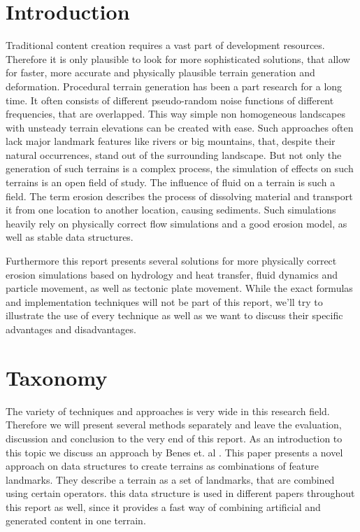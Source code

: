 \section{Introduction}
Traditional content creation requires a vast part of development resources. Therefore it is only plausible to look for more sophisticated solutions, that allow for faster, more accurate and physically plausible terrain generation and deformation. Procedural terrain generation has been a part research for a long time. It often consists of different pseudo-random noise functions of different frequencies, that are overlapped. This way simple non homogeneous landscapes with unsteady terrain elevations can be created with ease. Such approaches often lack major landmark features like rivers or big mountains, that, despite their natural occurrences, stand out of the surrounding landscape. But not only the generation of such terrains is a complex process, the simulation of effects on such terrains is an open field of study. The influence of fluid on a terrain is such a field. The term erosion describes the process of dissolving material and transport it from one location to another location, causing sediments. Such simulations heavily rely on physically correct flow simulations and a good erosion model, as well as stable data structures. 

Furthermore this report presents several solutions for more physically correct erosion simulations based on hydrology and heat transfer, fluid dynamics and particle movement, as well as tectonic plate movement. While the exact formulas  and implementation techniques will not be part of this report, we'll try to illustrate the use of every technique as well as we want to discuss their specific advantages and disadvantages.


\section{Taxonomy}

The variety of techniques and approaches is very wide in this research field. Therefore we will present several methods separately and leave the evaluation, discussion and conclusion to the very end of this report. As an introduction to this topic we discuss an approach by Benes et. al \cite{CGF:CGF12530}. This paper presents a novel approach on data structures to create terrains as combinations of feature landmarks. They describe a terrain as a set of landmarks, that are combined using certain operators. this data structure is used in different papers throughout this report as well, since it provides a fast way of combining artificial and generated content in one terrain. 

